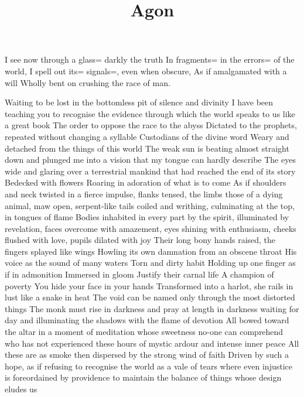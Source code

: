 \documentclass{article}
\title{Agon}
\newenvironment{stanza}{\begin{minipage}{10cm}\obeylines}{\end{minipage}\vspace{\baselineskip}}
\begin{document}
\maketitle

\clearpage


\begin{stanza}
I see now through a glass= darkly the truth
In fragments= in the errors= of the world,
I spell out its= signals=, even when obscure,
As if amalgamated with a will
Wholly bent on crushing the race of man.
\end{stanza}

\iffalse
Waiting to be lost in the bottomless pit of silence and divinity
I have been teaching you to recognise the evidence through which the world speaks to us like a great book
The order to oppose the race to the abyss
Dictated to the prophets, repeated without changing a syllable
Custodians of the divine word
Weary and detached from the things of this world
The weak sun is beating almost straight down and plunged me into a vision that my tongue can hardly describe
The eyes wide and glaring over a terrestrial mankind that had reached the end of its story
Bedecked with flowers
Roaring in adoration of what is to come
As if shoulders and neck twisted in a fierce impulse, flanks tensed, the limbs those of a dying animal, maw open, serpent-like tails coiled and writhing, culminating at the top, in tongues of flame
Bodies inhabited in every part by the spirit, illuminated by revelation, faces overcome with amazement, eyes shining with enthusiasm, cheeks flushed with love, pupils dilated with joy
Their long bony hands raised, the fingers splayed like wings
Howling its own damnation from an obscene throat
His voice as the sound of many waters
Torn and dirty habit
Holding up one finger as if in admonition
Immersed in gloom
Justify their carnal life
A champion of poverty
You hide your face in your hands
Transformed into a harlot, she rails in lust like a snake in heat
The void can be named only through the most distorted things
The monk must rise in darkness and pray at length in darkness waiting for day and illuminating the shadows with the flame of devotion
All bowed toward the altar in a moment of meditation whose sweetness no-one can comprehend who has not experienced these hours of mystic ardour and intense inner peace
All these are as smoke then dispersed by the strong wind of faith
Driven by such a hope, as if refusing to recognise the world as a vale of tears where even injustice is foreordained by providence to maintain the balance of things whose design eludes us
\end{document}
